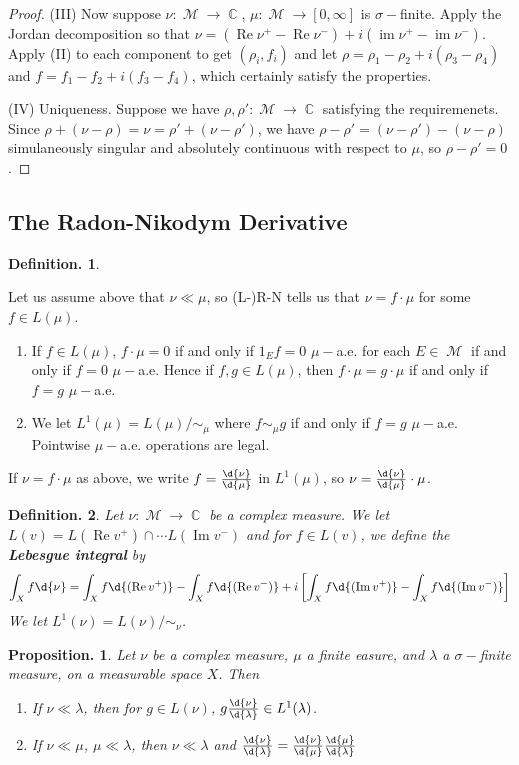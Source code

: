 \documentclass[11pt, a4paper]{memoir}
\DeclareMathOperator{\C}{{\mathbb{C}}}
\theoremstyle{change}
\newtheorem{proposition}[theorem]{Proposition.}
\theoremstyle{plain}
\theoremstyle{nonumberplain}
\newtheorem{definition}{Definition.}
\newtheorem{proof}{Proof}
\DeclareMathOperator{\im}{im}
\DeclareMathOperator{\M}{{\mathcal{M}}}
\renewcommand{\Re}{\ensuremath{\operatorname{Re}}}
\renewcommand{\Im}{\ensuremath{\operatorname{Im}}}
\begin{document}
\begin{proof}
    (III) Now suppose $\nu:\M\to\C$, $\mu:\M\to[0,\infty]$ is $\sigma-$finite.
    Apply the Jordan decomposition so that $\nu=(\Re\nu^+-\Re\nu^-)+i(\im\nu^+-\im\nu^-)$.
    Apply (II) to each component to get $(\rho_i,f_i)$ and let $\rho=\rho_1-\rho_2+i(\rho_3-\rho_4)$ and $f=f_1-f_2+i(f_3-f_4)$, which certainly satisfy the properties.

    (IV) Uniqueness.
    Suppose we have $\rho,\rho':\M\to\C$ satisfying the requiremenets.
    Since $\rho+(\nu-\rho)=\nu=\rho'+(\nu-\rho')$, we have $\rho-\rho'=(\nu-\rho')-(\nu-\rho)$ simulaneously singular and absolutely continuous with respect to $\mu$, so $\rho-\rho'=0$.
\end{proof}
\subsection{The Radon-Nikodym Derivative}
\begin{definition}
\end{definition}
Let us assume above that $\nu\ll\mu$, so (L-)R-N tells us that $\nu=f\cdot\mu$ for some $f\in L(\mu)$.
\begin{enumerate}
    \item If $f\in L(\mu)$, $f\cdot\mu=0$ if and only if $1_Ef=0$ $\mu-$a.e. for each $E\in\M$ if and only if $f=0$ $\mu-$a.e.
        Hence if $f,g\in L(\mu)$, then $f\cdot\mu=g\cdot\mu$ if and only if $f=g$ $\mu-$a.e.
    \item We let $L^1(\mu)=L(\mu)/\sim_\mu$ where $f\sim_\mu g$ if and only if $f=g$ $\mu-$a.e.
        Pointwise $\mu-$a.e. operations are legal.
\end{enumerate}
If $\nu=f\cdot\mu$ as above, we write $f=\frac{\d{\nu}}{\d{\mu}}$ in $L^1(\mu)$, so $\nu=\frac{\d{\nu}}{\d{\mu}}\cdot\mu$.
\begin{definition}
    Let $\nu:\M\to\C$ be a complex measure.
    We let $L(v)=L(\Re v^+)\cap\cdots L(\Im v^-)$ and for $f\in L(v)$, we define the \textbf{Lebesgue integral} by
    \begin{equation*}
        \int_X f\d{\nu}=\int_X f\d{(\Re v^+)}-\int_X f\d{(\Re v^-)}+i\left[\int_X f\d{(\Im v^+)}-\int_X f\d{(\Im v^-)}\right]
    \end{equation*}
    We let $L^1(\nu)=L(\nu)/\sim_\nu$.
\end{definition}
\begin{proposition}
    Let $\nu$ be a complex measure, $\mu$ a finite easure, and $\lambda$ a $\sigma-$finite measure, on a measurable space $X$.
    Then
    \begin{enumerate}[nolistsep,label=(\roman*)]
        \item If $\nu\ll\lambda$, then for $g\in L(\nu)$, $g\frac{\d{\nu}}{\d{\lambda}}\in L^1(\lambda)$.
        \item If $\nu\ll\mu$, $\mu\ll\lambda$, then $\nu\ll\lambda$ and $\frac{\d{\nu}}{\d{\lambda}}=\frac{\d{\nu}}{\d{\mu}}\frac{\d{\mu}}{\d{\lambda}}$
    \end{enumerate}
\end{proposition}
\end{document}
